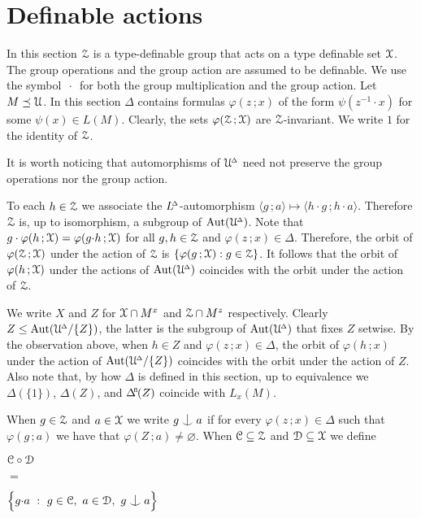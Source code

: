 \section{Definable actions}
\label{definable}


\def\ceq#1#2#3{\noindent\parbox[t]{15ex}{$\displaystyle #1$}\parbox{6ex}{\hfil $#2$}{$\displaystyle #3$}}

In this section $\EuScript Z$ is a type-definable group that acts on a type definable set $\EuScript X$.
The group operations and the group action are assumed to be definable.
We use the symbol $\,\cdot\,$ for both the group multiplication and the group action.
Let $M\preceq\EuScript U$.
In this section $\Delta$ contains formulas $\varphi(z\,;x)$ of the form $\psi(z^{-1}\!\cdot x)$ for some $\psi(x)\in L(M)$.
Clearly, the sets $\varphi(\EuScript Z\,;\EuScript X)$ are $\EuScript Z$-invariant.
We write $1$ for the identity of $\EuScript Z$.

It is worth noticing that automorphisms of $\EuScript U\kern-.2ex^{\scriptscriptstyle\Delta}$ need not preserve the group operations nor the group action.

To each $h\in\EuScript Z$ we associate the $L\kern-.4ex^{\scriptscriptstyle\Delta}$-automorphism $\langle g\,;a\rangle\mapsto\langle h{\cdot}g\,;h{\cdot}a\rangle$.
Therefore $\EuScript Z$ is, up to isomorphism, a subgroup of ${\rm Aut}(\EuScript U\kern-.2ex^{\scriptscriptstyle\Delta})$.
Note that $g\cdot\varphi(h\,;\EuScript X)=\varphi(g{\cdot}h\,;\EuScript X)$ for all $g,h\in\EuScript Z$ and $\varphi(z\,;x)\in\Delta$.
Therefore, the orbit of $\varphi(\EuScript Z\,;\EuScript X)$ under the action of $\EuScript Z$ is $\{\varphi(g\,;\EuScript X) : g\in\EuScript Z\}$.
It follows that the orbit of $\varphi(h\,;\EuScript X)$ under the actions of ${\rm Aut}(\EuScript U\kern-.2ex^{\scriptscriptstyle\Delta})$ coincides with the orbit under the action of $\EuScript Z$.

We write $X$ and $Z$ for $\EuScript X\cap M^x$ and $\EuScript Z\cap M^z$ respectively.
Clearly $Z\le{\rm Aut}(\EuScript U\kern-.2ex^{\scriptscriptstyle\Delta}/\{Z\})$, the latter is the subgroup of ${\rm Aut}(\EuScript U\kern-.2ex^{\scriptscriptstyle\Delta})$ that fixes $Z$ setwise.
By the observation above, when $h\in Z$ and $\varphi(z\,;x)\in\Delta$, the orbit of $\varphi(h\,;x)$ under the action of ${\rm Aut}(\EuScript U\kern-.2ex^{\scriptscriptstyle\Delta}/\{Z\})$ coincides with the orbit under the action of $Z$.
Also note that, by how $\Delta$ is defined in this section, up to equivalence we $\Delta(\{1\})$, $\Delta(Z)$, and $\BDelta(Z)$ coincide with $L_x(M)$.

When $g\in\EuScript Z$ and $a\in\EuScript X$ we write $g\nonfork a$ if for every $\varphi(z\,;x)\in\Delta$ such that $\varphi(g\,;a)$ we have that $\varphi(Z\,;a)\neq\varnothing$.
When $\EuScript C\subseteq\EuScript Z$ and $\EuScript D\subseteq\EuScript X$ we define

\ceq{\hfill\C\circ\D}{=}{\Big\{g{\cdot}a\ :\ g\in\C,\ a\in\D,\ g\nonfork a\Big\}}

